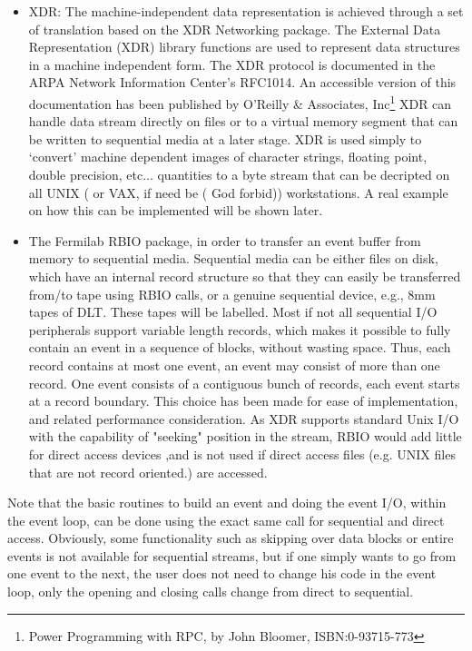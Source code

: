\begin{itemize}
\item	XDR: The machine-independent data representation is  achieved through a
set of translation based on the XDR Networking package. The External Data
Representation (XDR) library functions are used to represent data structures
in a machine independent form. The XDR protocol is documented in the 
ARPA Network Information Center's RFC1014. An accessible version of this 
documentation has been published by O'Reilly \& Associates, Inc\footnote{Power
Programming with RPC, by John Bloomer, ISBN:0-93715-773}
   XDR can handle data
stream directly on files or to a virtual memory  segment that can be written to
sequential media at a later stage. XDR is used simply to `convert' machine
dependent images of character strings, floating  point, double precision,
etc... quantities to a byte stream that can be decripted on all UNIX ( or VAX,
if need be ( God forbid)) workstations.  A real example on how this can be
implemented will be shown later. 
\item  The Fermilab RBIO package, in order to transfer an event  buffer from
memory to sequential media. Sequential media can be either files on disk, 
which have an internal record structure so that they can easily be transferred 
from/to tape using RBIO calls, or a genuine sequential device, e.g., 
8mm tapes of DLT.  These tapes will be labelled.  Most if not all
sequential I/O peripherals support variable length records,  which
makes it possible to fully contain an event in a sequence of blocks,  without
wasting space. Thus, each record contains at most one event, an  event may
consist of more than one record. One event consists of a contiguous bunch of
records, each event starts at a record boundary. This choice has been made for
ease of implementation, and related performance consideration.  As XDR supports
standard Unix I/O  with the capability of "seeking" position in the stream,
RBIO would add little  for direct access devices ,and is not used if direct 
access files (e.g. UNIX files that are not record oriented.) are accessed.
\end{itemize}

	Note that the basic routines to build an event and doing the 
event I/O, within the event loop, can be done using the exact same call 
for sequential and direct access.  Obviously, some functionality such as 
skipping over data blocks or entire events is not available for sequential 
streams, but if one simply wants to go from one event to the next, 
the user does not need to change his code in the event loop, only the opening 
and closing calls change from direct to sequential.  

